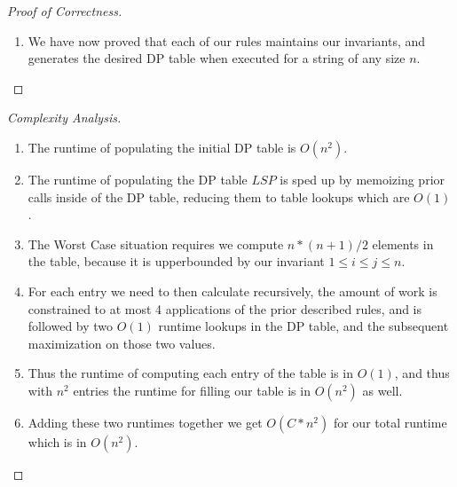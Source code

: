 \documentclass{article}
\begin{document}
\begin{proof}[Proof of Correctness]
\begin{enumerate}
\begin{proof}[2nd Lemma: Rule 3]
\begin{enumerate}
\begin{enumerate}
                                          \item If \(p'' \in (y_1,\dots,y_{n-1})\)  then \(p'' == p\).
                                          \item If \(p'' \notin (y_1,\dots,y_{n-1})\)  then \(p'' \in (y_2,\dots,y_n)\) and
                                                \(p'' == p'\).
                                          \item We can now see that \(|p''|\) must be the \(MAX(|p|,|p'|)\) such that
                                                \(p''\) is an LSP \(p'' \in y\).
                                    \end{enumerate}
                              \item Thus, by induction, we may see that we have proved our proposition for Rule 3.
                        \end{enumerate}
                  \end{proof}
            \item We have now proved that each of our rules maintains our invariants, and generates
                  the desired DP table when executed for a string of any size \(n\).
      \end{enumerate}
\end{proof}

\begin{proof}[Complexity Analysis]
      \begin{enumerate}
            \item The runtime of populating the initial DP table is \(O(n^2)\).
            \item The runtime of populating the DP table \(LSP\) is sped up by memoizing
                  prior calls inside of the DP table, reducing them to table lookups which are \(O(1)\).
            \item The Worst Case situation requires we compute \(n*(n + 1)/2\) elements in the table, because it is
                  upperbounded by our invariant \(1 \leq i \leq j \leq n\).
            \item For each entry we need to then calculate recursively, the amount of work
                  is constrained to at most 4
                  applications of the prior described rules, and is followed by two
                  \(O(1)\) runtime
                  lookups in the DP table, and the subsequent maximization on those two values.
            \item Thus the runtime of computing each entry of the table is in \(O(1)\),
                  and thus with \(n^2\) entries
                  the runtime for filling our table is in \(O(n^2)\) as well.
            \item Adding these two runtimes together we get \(O(C * n^2)\) for our total runtime which is in
                  \(O(n^2)\).
      \end{enumerate}
\end{proof}
\end{document}
